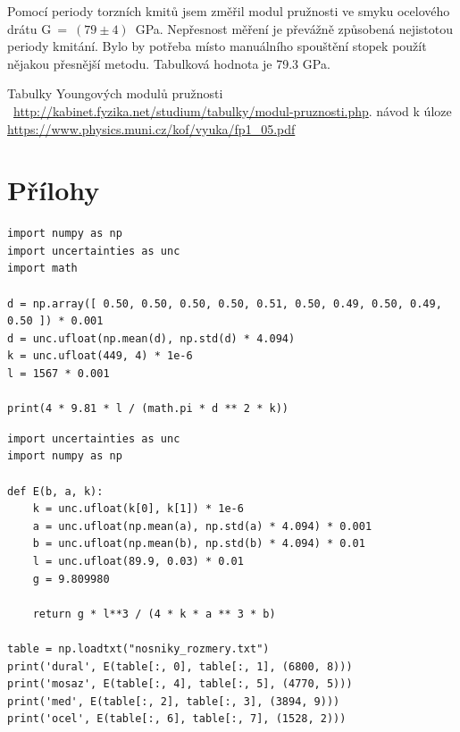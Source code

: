 \documentclass[a4paper,11pt]{article}
\begin{document}
Pomocí periody torzních kmitů jsem změřil modul pružnosti ve smyku ocelového drátu \linebreak \mbox{G = $(79\pm4)$ GPa.} Nepřesnost měření je převážně způsobená nejistotou periody kmitání. Bylo by potřeba místo manuálního spouštění stopek použít nějakou přesnější metodu. Tabulková hodnota je 79.3 GPa. \\

\vspace{25pt}

\begin{thebibliography}{0}
 Tabulky Youngových modulů pružnosti ~\url{http://kabinet.fyzika.net/studium/tabulky/modul-pruznosti.php}.   
 návod k úloze \url{https://www.physics.muni.cz/kof/vyuka/fp1_05.pdf}
\end{thebibliography}




\section{Přílohy}

\begin{lstlisting}[caption={Výpočet modulu pružnosti v tahu přímou metodou }]
import numpy as np
import uncertainties as unc
import math

d = np.array([ 0.50, 0.50, 0.50, 0.50, 0.51, 0.50, 0.49, 0.50, 0.49, 0.50 ]) * 0.001
d = unc.ufloat(np.mean(d), np.std(d) * 4.094)
k = unc.ufloat(449, 4) * 1e-6
l = 1567 * 0.001

print(4 * 9.81 * l / (math.pi * d ** 2 * k))
\end{lstlisting}

\begin{lstlisting}[caption={Výpočet modulů pružností nosníků}]
import uncertainties as unc
import numpy as np

def E(b, a, k):
    k = unc.ufloat(k[0], k[1]) * 1e-6 
    a = unc.ufloat(np.mean(a), np.std(a) * 4.094) * 0.001
    b = unc.ufloat(np.mean(b), np.std(b) * 4.094) * 0.01
    l = unc.ufloat(89.9, 0.03) * 0.01
    g = 9.809980

    return g * l**3 / (4 * k * a ** 3 * b)

table = np.loadtxt("nosniky_rozmery.txt")
print('dural', E(table[:, 0], table[:, 1], (6800, 8)))
print('mosaz', E(table[:, 4], table[:, 5], (4770, 5)))
print('med', E(table[:, 2], table[:, 3], (3894, 9)))
print('ocel', E(table[:, 6], table[:, 7], (1528, 2)))
\end{lstlisting}
\end{document}
